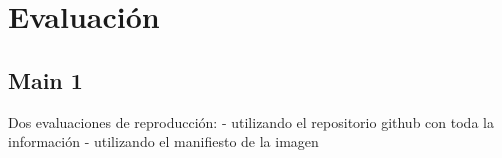 
\chapter{Evaluación} %

\label{ChapterX} %



\section{Main  1}
 
Dos evaluaciones de reproducción:
- utilizando el repositorio github con toda la información
- utilizando el manifiesto de la imagen